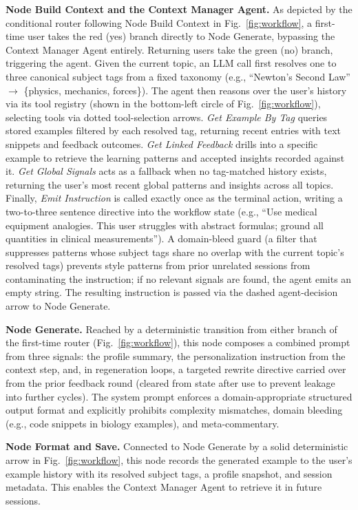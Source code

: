 \documentclass[conference]{IEEEtran}
\begin{document}
\textbf{Node Build Context and the Context Manager Agent.} As depicted by the conditional router following Node Build Context in Fig.~\ref{fig:workflow}, a first-time user takes the red (yes) branch directly to Node Generate, bypassing the Context Manager Agent entirely. Returning users take the green (no) branch, triggering the agent. Given the current topic, an LLM call first resolves one to three canonical subject tags from a fixed taxonomy (e.g., ``Newton's Second Law'' $\to$ \{physics, mechanics, forces\}). The agent then reasons over the user's history via its tool registry (shown in the bottom-left circle of Fig.~\ref{fig:workflow}), selecting tools via dotted tool-selection arrows. \textit{Get Example By Tag} queries stored examples filtered by each resolved tag, returning recent entries with text snippets and feedback outcomes. \textit{Get Linked Feedback} drills into a specific example to retrieve the learning patterns and accepted insights recorded against it. \textit{Get Global Signals} acts as a fallback when no tag-matched history exists, returning the user's most recent global patterns and insights across all topics. Finally, \textit{Emit Instruction} is called exactly once as the terminal action, writing a two-to-three sentence directive into the workflow state (e.g., ``Use medical equipment analogies. This user struggles with abstract formulas; ground all quantities in clinical measurements''). A domain-bleed guard (a filter that suppresses patterns whose subject tags share no overlap with the current topic's resolved tags) prevents style patterns from prior unrelated sessions from contaminating the instruction; if no relevant signals are found, the agent emits an empty string. The resulting instruction is passed via the dashed agent-decision arrow to Node Generate.

\textbf{Node Generate.} Reached by a deterministic transition from either branch of the first-time router (Fig.~\ref{fig:workflow}), this node composes a combined prompt from three signals: the profile summary, the personalization instruction from the context step, and, in regeneration loops, a targeted rewrite directive carried over from the prior feedback round (cleared from state after use to prevent leakage into further cycles). The system prompt enforces a domain-appropriate structured output format and explicitly prohibits complexity mismatches, domain bleeding (e.g., code snippets in biology examples), and meta-commentary.

\textbf{Node Format and Save.} Connected to Node Generate by a solid deterministic arrow in Fig.~\ref{fig:workflow}, this node records the generated example to the user's example history with its resolved subject tags, a profile snapshot, and session metadata. This enables the Context Manager Agent to retrieve it in future sessions.
\end{document}
